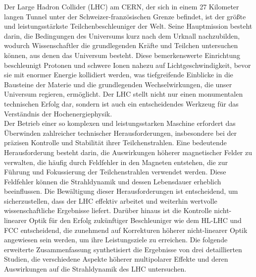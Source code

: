 {
\fontsize{\fontsizesummary}{\fontskipsummary}\selectfont


Der Large Hadron Collider (LHC) am CERN, der sich in einem 27 Kilometer langen Tunnel unter der Schweizer-französischen Grenze befindet, ist der größte und leistungsstärkste Teilchenbeschleuniger der Welt. Seine Hauptmission besteht darin, die Bedingungen des Universums kurz nach dem Urknall nachzubilden, wodurch Wissenschaftler die grundlegenden Kräfte und Teilchen untersuchen können, aus denen das Universum besteht. Diese bemerkenswerte Einrichtung beschleunigt Protonen und schwere Ionen nahezu auf Lichtgeschwindigkeit, bevor sie mit enormer Energie kollidiert werden, was tiefgreifende Einblicke in die Bausteine der Materie und die grundlegenden Wechselwirkungen, die unser Universum regieren, ermöglicht. Der LHC stellt nicht nur einen monumentalen technischen Erfolg dar, sondern ist auch ein entscheidendes Werkzeug für das Verständnis der Hochenergiephysik.
\\
\indent
Der Betrieb einer so komplexen und leistungsstarken Maschine erfordert das Überwinden zahlreicher technischer Herausforderungen, insbesondere bei der präzisen Kontrolle und Stabilität ihrer Teilchenstrahlen. Eine bedeutende Herausforderung besteht darin, die Auswirkungen höherer magnetischer Felder zu verwalten, die häufig durch Feldfehler in den Magneten entstehen, die zur Führung und Fokussierung der Teilchenstrahlen verwendet werden. Diese Feldfehler können die Strahldynamik und dessen Lebensdauer erheblich beeinflussen. Die Bewältigung dieser Herausforderungen ist entscheidend, um sicherzustellen, dass der LHC effektiv arbeitet und weiterhin wertvolle wissenschaftliche Ergebnisse liefert. Darüber hinaus ist die Kontrolle nicht-linearer Optik für den Erfolg zukünftiger Beschleuniger wie dem HL-LHC und FCC entscheidend, die zunehmend auf Korrekturen höherer nicht-linearer Optik angewiesen sein werden, um ihre Leistungsziele zu erreichen. Die folgende erweiterte Zusammenfassung synthetisiert die Ergebnisse von drei detaillierten Studien, die verschiedene Aspekte höherer multipolarer Effekte und deren Auswirkungen auf die Strahldynamik des LHC untersuchen.

}
